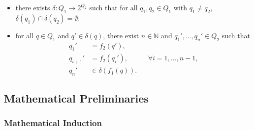 \documentclass[letterpaper, reqno,11pt]{article}
\newcommand{\NN}{\mathbb{N}}
\begin{document}
\begin{enumerate}
\begin{itemize}
        \item there exists $\delta : Q_1 \to 2^{Q_2}$ such that for all $q_1, q_2 \in Q_1$ with $q_1 \neq q_2$, $\delta\left(q_1\right) \cap \delta\left(q_2\right) = \emptyset$;
        \item for all $q \in Q_1$ and $q' \in \delta(q)$, there exist $n \in \NN$ and $q_1', \ldots, q_n' \in Q_2$ such that
        \begin{align*}
            q_1' &= f_2\left(q'\right), \\
            q_{i + 1}' &= f_2\left(q_i'\right), && \forall i = 1, \ldots, n - 1, \\
            q_n' &\in \delta\left(f_1(q)\right).
        \end{align*}
    \end{itemize}
\end{enumerate}

\subsection{Mathematical Preliminaries}

\subsubsection{Mathematical Induction}
\end{document}
